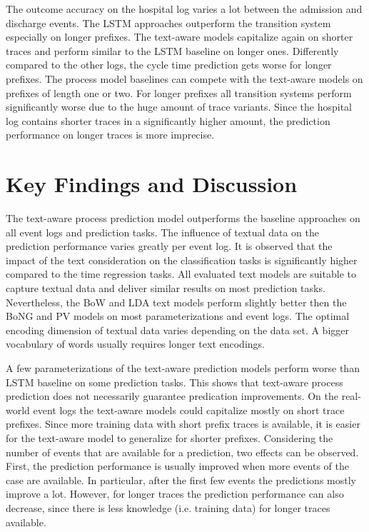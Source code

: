 The outcome accuracy on the hospital log varies a lot between the admission and discharge events.
The LSTM approaches outperform the transition system especially on longer prefixes.
The text-aware models capitalize again on shorter traces and perform similar to the LSTM baseline on longer ones.
Differently compared to the other logs, the cycle time prediction gets worse for longer prefixes.
The process model baselines can compete with the text-aware models on prefixes of length one or two.
For longer prefixes all transition systems perform significantly worse due to the huge amount of trace variants.
Since the hospital log contains shorter traces in a significantly higher amount, the prediction performance on longer traces is more imprecise.
 

\section{Key Findings and Discussion}

The text-aware process prediction model outperforms the baseline approaches on all event logs and prediction tasks.
The influence of textual data on the prediction performance varies greatly per event log.
It is observed that the impact of the text consideration on the classification tasks is significantly higher compared to the time regression tasks.
All evaluated text models are suitable to capture textual data and deliver similar results on most prediction tasks.
Nevertheless, the BoW and LDA text models perform slightly better then the BoNG and PV models on most parameterizations and event logs.
The optimal encoding dimension of textual data varies depending on the data set.
A bigger vocabulary of words usually requires longer text encodings.

A few parameterizations of the text-aware prediction models perform worse than LSTM baseline on some prediction tasks.
This shows that text-aware process prediction does not necessarily guarantee predication improvements.
On the real-world event logs the text-aware models could capitalize mostly on short trace prefixes.
Since more training data with short prefix traces is available, it is easier for the text-aware model to generalize for shorter prefixes.
Considering the number of events that are available for a prediction, two effects can be observed.
First, the prediction performance is usually improved when more events of the case are available.
In particular, after the first few events the predictions mostly improve a lot.
However, for longer traces the prediction performance can also decrease, since there is less knowledge (i.e. training data) for longer traces available.

